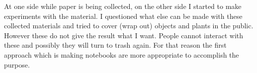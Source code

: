 


At one side while paper is being collected, on the other side I started to make experiments with the material. I questioned what else can be made with these collected materials and tried to cover (wrap out) objects and plants in the public. However these do not give the result what I want. People cannot interact with these and possibly they will turn to trash again. For that reason the first approach which is making notebooks are more appropriate to accomplish the purpose.

